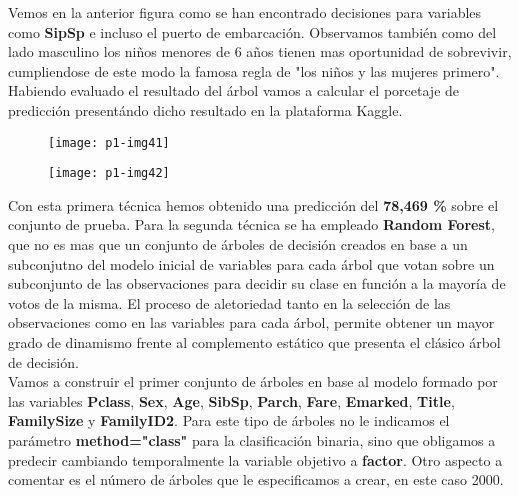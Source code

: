 \documentclass[10pt]{article}
\begin{document}
Vemos en la anterior figura como se han encontrado decisiones para variables como \textbf{SipSp} e incluso el puerto de embarcación.  Observamos también como del lado masculino los niños menores de 6 años tienen mas oportunidad de sobrevivir, cumpliendose de este modo la famosa regla de "los niños y las mujeres primero". \\

Habiendo evaluado el resultado del árbol vamos a calcular el porcetaje de predicción presentándo dicho resultado en la plataforma Kaggle. \\

\begin{figure}[H]
	\begin{center}
 		\texttt{[image: p1-img41]}
	\end{center} 
\end{figure} 

\begin{figure}[H]
	\begin{center}
 		\texttt{[image: p1-img42]}
	\end{center} 
\end{figure} 

Con esta primera técnica hemos obtenido una predicción del \textbf{78,469 \%} sobre el conjunto de prueba. Para la segunda técnica se ha empleado \textbf{Random Forest}, que no es mas que un conjunto de árboles de decisión creados en base a un subconjutno del modelo inicial de variables para cada árbol que votan sobre un subconjunto de las observaciones para decidir su clase en función a la mayoría de votos de la misma. El proceso de aletoriedad tanto en la selección de las observaciones como en las variables para cada árbol, permite obtener un mayor grado de dinamismo frente al complemento estático que presenta el clásico árbol de decisión. \\

Vamos a construir el primer conjunto de árboles en base al modelo formado por las variables \textbf{Pclass}, \textbf{Sex}, \textbf{Age}, \textbf{SibSp}, \textbf{Parch}, \textbf{Fare}, \textbf{Emarked}, \textbf{Title}, \textbf{FamilySize} y \textbf{FamilyID2}. Para este tipo de árboles no le indicamos el parámetro \textbf{method="class"} para la clasificación binaria, sino que obligamos a predecir cambiando temporalmente la variable objetivo a \textbf{factor}. Otro aspecto a comentar es el número de árboles que le especificamos a crear, en este caso 2000.\\
\end{document}
